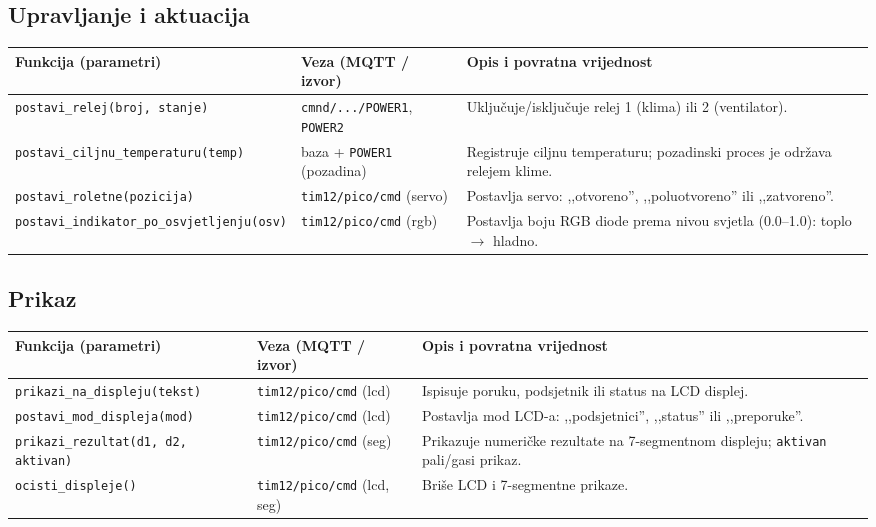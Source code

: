 \documentclass[11pt,a4paper]{article}
\begin{document}
\subsection{Upravljanje i aktuacija}
{\small
      \begin{tabularx}{\textwidth}{@{}L{0.45\textwidth} L{0.22\textwidth} X@{}}
            \toprule
            \textbf{Funkcija (parametri)}                      & \textbf{Veza (MQTT / izvor)}              & \textbf{Opis i povratna vrijednost}                                                  \\
            \midrule
            \texttt{postavi\_relej(broj, stanje)}              & \texttt{cmnd/.../POWER1}, \texttt{POWER2} & Uključuje/isključuje relej 1 (klima) ili 2 (ventilator).                             \\
            \texttt{postavi\_ciljnu\_temperaturu(temp)}        & baza + \texttt{POWER1} (pozadina)         & Registruje ciljnu temperaturu; pozadinski proces je održava relejem klime.           \\
            \texttt{postavi\_roletne(pozicija)}                & \texttt{tim12/pico/cmd} (servo)           & Postavlja servo: ,,otvoreno'', ,,poluotvoreno'' ili ,,zatvoreno''.                   \\
            \texttt{postavi\_indikator\_po\_osvjetljenju(osv)} & \texttt{tim12/pico/cmd} (rgb)             & Postavlja boju RGB diode prema nivou svjetla (0.0--1.0): toplo $\rightarrow$ hladno. \\
            \bottomrule
      \end{tabularx}
}

\subsection{Prikaz}
{\small
      \begin{tabularx}{\textwidth}{@{}L{0.32\textwidth} L{0.22\textwidth} X@{}}
            \toprule
            \textbf{Funkcija (parametri)}               & \textbf{Veza (MQTT / izvor)}       & \textbf{Opis i povratna vrijednost}                                                        \\
            \midrule
            \texttt{prikazi\_na\_displeju(tekst)}       & \texttt{tim12/pico/cmd} (lcd)      & Ispisuje poruku, podsjetnik ili status na LCD displej.                                     \\
            \texttt{postavi\_mod\_displeja(mod)}        & \texttt{tim12/pico/cmd} (lcd)      & Postavlja mod LCD-a: ,,podsjetnici'', ,,status'' ili ,,preporuke''.                        \\
            \texttt{prikazi\_rezultat(d1, d2, aktivan)} & \texttt{tim12/pico/cmd} (seg)      & Prikazuje numeričke rezultate na 7-segmentnom displeju; \texttt{aktivan} pali/gasi prikaz. \\
            \texttt{ocisti\_displeje()}                 & \texttt{tim12/pico/cmd} (lcd, seg) & Briše LCD i 7-segmentne prikaze.                                                           \\
            \bottomrule
      \end{tabularx}
}
\end{document}
